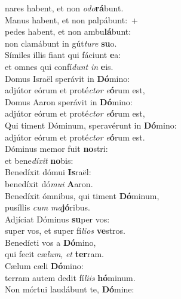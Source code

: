 \evenverse nares habent, et non \textit{o}\textit{do}\textbf{rá}bunt.\\
\oddverse Manus habent, et non palpábunt:~+\\
\oddverse  pedes habent, et non ambu\textbf{lá}bunt:~\*\\
\oddverse non clamábunt in gút\textit{tu}\textit{re} \textbf{su}o.\\
\evenverse Símiles illis fiant qui fáciunt \textbf{e}a:~\*\\
\evenverse et omnes qui confí\textit{dunt} \textit{in} \textbf{e}is.\\
\oddverse Domus Israël sperávit in \textbf{Dó}mino:~\*\\
\oddverse adjútor eórum et proté\textit{ctor} \textit{e}\textbf{ó}rum est,\\
\evenverse Domus Aaron sperávit in \textbf{Dó}mino:~\*\\
\evenverse adjútor eórum et proté\textit{ctor} \textit{e}\textbf{ó}rum est,\\
\oddverse Qui timent Dóminum, speravérunt in \textbf{Dó}mino:~\*\\
\oddverse adjútor eórum et proté\textit{ctor} \textit{e}\textbf{ó}rum est.\\
\evenverse Dóminus memor fuit \textbf{no}stri:~\*\\
\evenverse et bene\textit{dí}\textit{xit} \textbf{no}bis:\\
\oddverse Benedíxit dómui \textbf{Is}raël:~\*\\
\oddverse benedíxit dó\textit{mu}\textit{i} \textbf{A}aron.\\
\evenverse Benedíxit ómnibus, qui timent \textbf{Dó}minum,~\*\\
\evenverse pusíllis \textit{cum} \textit{ma}\textbf{jó}ribus.\\
\oddverse Adjíciat Dóminus \textbf{su}per vos:~\*\\
\oddverse super vos, et super fí\textit{li}\textit{os} \textbf{ve}stros.\\
\evenverse Benedícti vos a \textbf{Dó}mino,~\*\\
\evenverse qui fecit cæ\textit{lum}, \textit{et} \textbf{ter}ram.\\
\oddverse Cælum cæli \textbf{Dó}mino:~\*\\
\oddverse terram autem dedit fí\textit{li}\textit{is} \textbf{hó}minum.\\
\evenverse Non mórtui laudábunt te, \textbf{Dó}mine:~\*\\

